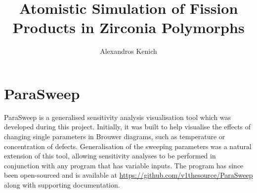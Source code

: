 \documentclass[a4paper,12pt,twoside]{report}
\begin{document}

\title{\LARGE {\bf Atomistic Simulation of Fission Products in Zirconia Polymorphs}
}

\author{Alexandros Kenich}

\normallinespacing
\maketitle



\preface
{}
%
%

\body

\doublespacing


\label{References}
\renewcommand\bibname{References}



\appendix
\label{Appendix}

\chapter{ParaSweep}

ParaSweep is a generalised sensitivity analysis visualisation tool which was developed during this project. Initially, it was built to help visualise the effects of changing single parameters in Brouwer diagrams, such as temperature or concentration of defects. Generalisation of the sweeping parameters was a natural extension of this tool, allowing sensitivity analyses to be performed in conjunction with any program that has variable inputs. The program has since been open-sourced and is available at \href{https://github.com/v1thesource/ParaSweep}{https://github.com/v1thesource/ParaSweep} along with supporting documentation.
\end{document}
